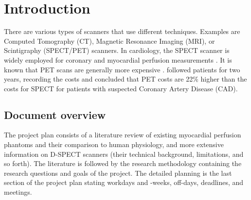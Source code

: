 \chapter{Introduction}
\label{ch:Intro}


There are various types of scanners that use different techniques. Examples are Computed Tomography (CT), Magnetic Resonance Imaging (MRI), or Scintigraphy (SPECT/PET) scanners. In cardiology, the SPECT scanner is widely employed for coronary and myocardial perfusion measurements \citep{rahmim2008pet}. It is known that PET scans are generally more expensive \citep{hlatky2014economic, RadioPead2018}. \cite{hlatky2014economic} followed patients for two years, recording the costs and concluded that PET costs are 22\% higher than the costs for SPECT for patients with suspected Coronary Artery Disease (CAD).

\section{Document overview}
\label{sec:doc_overview}
The project plan consists of a literature review of existing myocardial perfusion phantoms and their comparison to human physiology, and more extensive information on D-SPECT scanners (their technical background, limitations, and so forth). The literature is followed by the research methodology containing the research questions and goals of the project. The detailed planning is the last section of the project plan stating workdays and -weeks, off-days, deadlines, and meetings.